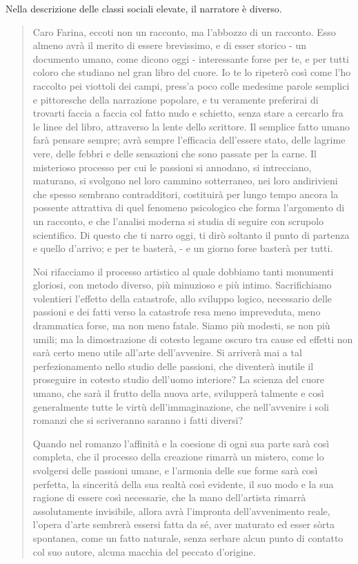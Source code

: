 \documentclass{book}
\newcounter{mar}
\begin{document}
Nella descrizione delle classi sociali elevate, il narratore è diverso.

\begin{quote}
Caro Farina, eccoti non un racconto, ma l'abbozzo di un racconto. Esso almeno avrà il merito di essere brevissimo, e di esser storico - un documento umano, come dicono oggi - interessante forse per te, e per tutti coloro che studiano nel gran libro del cuore. Io te lo ripeterò così come l'ho raccolto pei viottoli dei campi, press'a poco colle medesime parole semplici e pittoresche della narrazione popolare, e tu veramente preferirai di trovarti faccia a faccia col fatto nudo e schietto, senza stare a cercarlo fra le linee del libro, attraverso la lente dello scrittore. Il semplice fatto umano farà pensare sempre; avrà sempre l'efficacia dell'essere stato, delle lagrime vere, delle febbri e delle sensazioni che sono passate per la carne. Il misterioso processo per cui le passioni si annodano, si intrecciano, maturano, si svolgono nel loro cammino sotterraneo, nei loro andirivieni che spesso sembrano contradditori, costituirà per lungo tempo ancora la possente attrattiva di quel fenomeno psicologico che forma l'argomento di un racconto, e che l'analisi moderna si studia di seguire con scrupolo scientifico. Di questo che ti narro oggi, ti dirò soltanto il punto di partenza e quello d'arrivo; e per te basterà, - e un giorno forse basterà per tutti.

  Noi rifacciamo il processo artistico al quale dobbiamo tanti monumenti gloriosi, con metodo diverso, più minuzioso e più intimo. Sacrifichiamo volentieri l'effetto della catastrofe, allo sviluppo logico, necessario delle passioni e dei fatti verso la catastrofe resa meno impreveduta, meno drammatica forse, ma non meno fatale. Siamo più modesti, se non più umili; ma la dimostrazione di cotesto legame oscuro tra cause ed effetti non sarà certo meno utile all'arte dell'avvenire. Si arriverà mai a tal perfezionamento nello studio delle passioni, che diventerà inutile il proseguire in cotesto studio dell'uomo interiore? La scienza del cuore umano, che sarà il frutto della nuova arte, svilupperà talmente e così generalmente tutte le virtù dell'immaginazione, che nell'avvenire i soli romanzi che si scriveranno saranno i fatti diversi?
  
  Quando nel romanzo l'affinità e la coesione di ogni sua parte sarà così completa, che il processo della creazione rimarrà un mistero, come lo svolgersi delle passioni umane, e l'armonia delle sue forme sarà così perfetta, la sincerità della sua realtà così evidente, il suo modo e la sua ragione di essere così necessarie, che la mano dell'artista rimarrà assolutamente invisibile, allora avrà l'impronta dell'avvenimento reale, l'opera d'arte sembrerà essersi fatta da sé, aver maturato ed esser sòrta spontanea, come un fatto naturale, senza serbare alcun punto di contatto col suo autore, alcuna macchia del peccato d'origine.
\end{quote}
\end{document}
